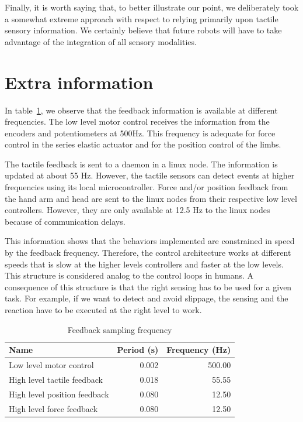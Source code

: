Finally, it is worth saying that, to better illustrate our point,
we deliberately took a somewhat extreme approach with respect to
relying primarily upon tactile sensory information. We certainly
believe that future robots will have to take advantage of the
integration of all sensory modalities.


\newpage


\section{Extra information}




\label{sec:imp:timing}

In table~\ref{tab:feedback}, we observe that the feedback
information is available at different frequencies. The low level
motor control receives the information from the encoders and
potentiometers at 500Hz. This frequency is adequate for force
control in the series elastic actuator and for the position
control of the limbs.

The tactile feedback is sent to a daemon in a linux node. The
information is updated at about 55 Hz. However, the tactile
sensors can detect events at higher frequencies using its local
microcontroller. Force and/or position feedback from the hand arm
and head are sent to the linux nodes from their respective low
level controllers. However, they are only available at 12.5 Hz to
the linux nodes because of communication delays.

This information shows that the behaviors implemented are
constrained in speed by the feedback frequency. Therefore, the
control architecture works at different speeds that is slow at the
higher levels controllers and faster at the low levels. This
structure is considered analog to the control loops in humans. A
consequence of this structure is that the right sensing has to be
used for a given task. For example, if we want to detect and avoid
slippage, the sensing and the reaction have to be executed at the
right level to work.


\begin{table}[htb]
  \caption[Feedback sampling frequency]{Feedback sampling frequency}
  \label{tab:feedback}
  \centering
  \begin{tabular}{|l|r|r|}
    \hline
    Name& Period (s)&Frequency (Hz)\\
    \hline
    Low level motor control&0.002&500.00\\
    High level tactile feedback & 0.018 & 55.55\\
    High level position feedback &0.080 & 12.50\\
    High level force feedback &0.080 & 12.50\\

    \hline
  \end{tabular}
\end{table}


